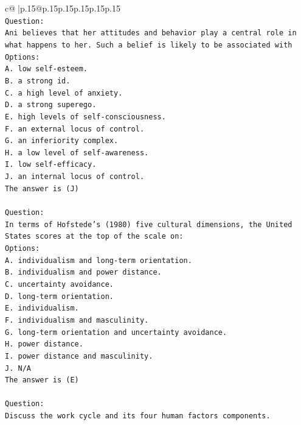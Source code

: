 \documentclass{article}
\begin{document}
{\begin{supertabular}{c@{$\;$}|p{.15\linewidth}@{}p{.15\linewidth}p{.15\linewidth}p{.15\linewidth}p{.15\linewidth}p{.15\linewidth}}
{{{\\ 
\texttt{Question:} \\
\texttt{Ani believes that her attitudes and behavior play a central role in what happens to her. Such a belief is likely to be associated with} \\
\texttt{Options:} \\
\texttt{A. low self{-}esteem.} \\
\texttt{B. a strong id.} \\
\texttt{C. a high level of anxiety.} \\
\texttt{D. a strong superego.} \\
\texttt{E. high levels of self{-}consciousness.} \\
\texttt{F. an external locus of control.} \\
\texttt{G. an inferiority complex.} \\
\texttt{H. a low level of self{-}awareness.} \\
\texttt{I. low self{-}efficacy.} \\
\texttt{J. an internal locus of control.} \\
\texttt{The answer is (J)} \\
\\ 
\texttt{Question:} \\
\texttt{In terms of Hofstede’s (1980) five cultural dimensions, the United States scores at the top of the scale on:} \\
\texttt{Options:} \\
\texttt{A. individualism and long{-}term orientation.} \\
\texttt{B. individualism and power distance.} \\
\texttt{C. uncertainty avoidance.} \\
\texttt{D. long{-}term orientation.} \\
\texttt{E. individualism.} \\
\texttt{F. individualism and masculinity.} \\
\texttt{G. long{-}term orientation and uncertainty avoidance.} \\
\texttt{H. power distance.} \\
\texttt{I. power distance and masculinity.} \\
\texttt{J. N/A} \\
\texttt{The answer is (E)} \\
\\ 
\texttt{Question:} \\
\texttt{Discuss the work cycle and its four human factors components.} \\
}}}
\end{supertabular}}
\end{document}
